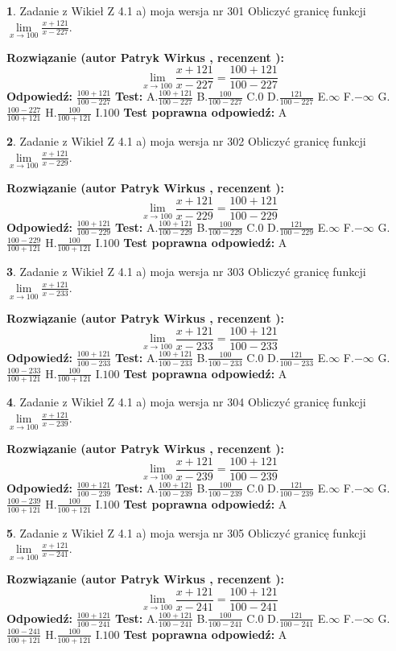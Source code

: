 \documentclass[12pt, a4paper]{article}
\theoremstyle{definition} %
\newtheorem{zad}{}
\newcommand{\zadStart}[1]{\begin{zad}#1\newline}
\newcommand{\zadStop}{\end{zad}}
\newcommand{\rozwStart}[2]{\noindent \textbf{Rozwiązanie (autor #1 , recenzent #2): }\newline}
\newcommand{\rozwStop}{\newline}
\newcommand{\odpStart}{\noindent \textbf{Odpowiedź:}\newline}
\newcommand{\odpStop}{\newline}
\newcommand{\testStart}{\noindent \textbf{Test:}\newline}
\newcommand{\testStop}{\newline}
\newcommand{\kluczStart}{\noindent \textbf{Test poprawna odpowiedź:}\newline}
\newcommand{\kluczStop}{\newline}
\begin{document}
\zadStart{Zadanie z Wikieł Z 4.1 a) moja wersja nr 301}
Obliczyć granicę funkcji $\lim\limits_{x\to100}\frac{x+121}{x-227}$.
\zadStop
\rozwStart{Patryk Wirkus}{}
$$\lim\limits_{x\to100}\frac{x+121}{x-227} = \frac{100+121}{100-227}$$
\rozwStop
\odpStart
$\frac{100+121}{100-227}$
\odpStop
\testStart
A.$\frac{100+121}{100-227}$
B.$\frac{100}{100-227}$
C.$0$
D.$\frac{121}{100-227}$
E.$\infty$
F.$-\infty$
G.$\frac{100-227}{100+121}$
H.$\frac{100}{100+121}$
I.$100$
\testStop
\kluczStart
A
\kluczStop



\zadStart{Zadanie z Wikieł Z 4.1 a) moja wersja nr 302}
Obliczyć granicę funkcji $\lim\limits_{x\to100}\frac{x+121}{x-229}$.
\zadStop
\rozwStart{Patryk Wirkus}{}
$$\lim\limits_{x\to100}\frac{x+121}{x-229} = \frac{100+121}{100-229}$$
\rozwStop
\odpStart
$\frac{100+121}{100-229}$
\odpStop
\testStart
A.$\frac{100+121}{100-229}$
B.$\frac{100}{100-229}$
C.$0$
D.$\frac{121}{100-229}$
E.$\infty$
F.$-\infty$
G.$\frac{100-229}{100+121}$
H.$\frac{100}{100+121}$
I.$100$
\testStop
\kluczStart
A
\kluczStop



\zadStart{Zadanie z Wikieł Z 4.1 a) moja wersja nr 303}
Obliczyć granicę funkcji $\lim\limits_{x\to100}\frac{x+121}{x-233}$.
\zadStop
\rozwStart{Patryk Wirkus}{}
$$\lim\limits_{x\to100}\frac{x+121}{x-233} = \frac{100+121}{100-233}$$
\rozwStop
\odpStart
$\frac{100+121}{100-233}$
\odpStop
\testStart
A.$\frac{100+121}{100-233}$
B.$\frac{100}{100-233}$
C.$0$
D.$\frac{121}{100-233}$
E.$\infty$
F.$-\infty$
G.$\frac{100-233}{100+121}$
H.$\frac{100}{100+121}$
I.$100$
\testStop
\kluczStart
A
\kluczStop



\zadStart{Zadanie z Wikieł Z 4.1 a) moja wersja nr 304}
Obliczyć granicę funkcji $\lim\limits_{x\to100}\frac{x+121}{x-239}$.
\zadStop
\rozwStart{Patryk Wirkus}{}
$$\lim\limits_{x\to100}\frac{x+121}{x-239} = \frac{100+121}{100-239}$$
\rozwStop
\odpStart
$\frac{100+121}{100-239}$
\odpStop
\testStart
A.$\frac{100+121}{100-239}$
B.$\frac{100}{100-239}$
C.$0$
D.$\frac{121}{100-239}$
E.$\infty$
F.$-\infty$
G.$\frac{100-239}{100+121}$
H.$\frac{100}{100+121}$
I.$100$
\testStop
\kluczStart
A
\kluczStop



\zadStart{Zadanie z Wikieł Z 4.1 a) moja wersja nr 305}
Obliczyć granicę funkcji $\lim\limits_{x\to100}\frac{x+121}{x-241}$.
\zadStop
\rozwStart{Patryk Wirkus}{}
$$\lim\limits_{x\to100}\frac{x+121}{x-241} = \frac{100+121}{100-241}$$
\rozwStop
\odpStart
$\frac{100+121}{100-241}$
\odpStop
\testStart
A.$\frac{100+121}{100-241}$
B.$\frac{100}{100-241}$
C.$0$
D.$\frac{121}{100-241}$
E.$\infty$
F.$-\infty$
G.$\frac{100-241}{100+121}$
H.$\frac{100}{100+121}$
I.$100$
\testStop
\kluczStart
A
\kluczStop
\end{document}
